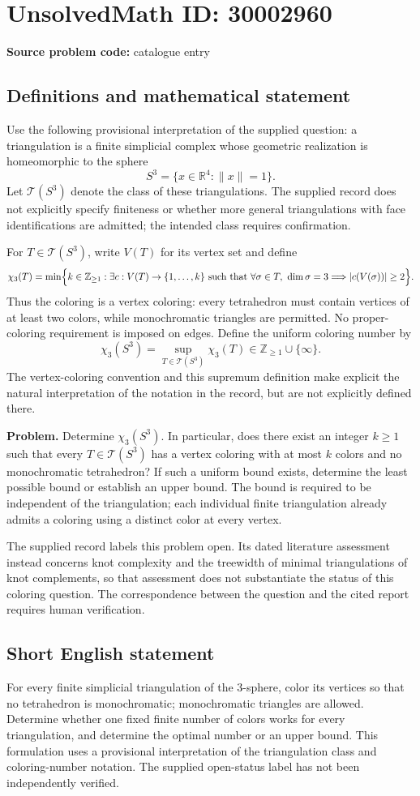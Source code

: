 \documentclass[11pt]{article}
\newcommand{\Z}{\mathbb{Z}}
\newcommand{\R}{\mathbb{R}}
\begin{document}
\section*{UnsolvedMath ID: 30002960}
\textbf{Source problem code:} catalogue entry
\subsection{Definitions and mathematical statement}
Use the following provisional interpretation of the supplied question: a triangulation is a finite simplicial complex whose geometric realization is homeomorphic to the sphere
\[
S^3=\{x\in\R^4:\|x\|=1\}.
\]
Let \(\mathcal T(S^3)\) denote the class of these triangulations. The supplied record does not explicitly specify finiteness or whether more general triangulations with face identifications are admitted; the intended class requires confirmation.

For \(T\in\mathcal T(S^3)\), write \(V(T)\) for its vertex set and define
\[
\chi_3(T)=\min\Bigl\{k\in\Z_{\geq 1}:\exists c:V(T)\to\{1,\ldots,k\}\ \text{such that}\ \forall\sigma\in T,\ \dim\sigma=3\Longrightarrow |c(V(\sigma))|\geq 2\Bigr\}.
\]
Thus the coloring is a vertex coloring: every tetrahedron must contain vertices of at least two colors, while monochromatic triangles are permitted. No proper-coloring requirement is imposed on edges. Define the uniform coloring number by
\[
\chi_3(S^3)=\sup_{T\in\mathcal T(S^3)}\chi_3(T)\in\Z_{\geq1}\cup\{\infty\}.
\]
The vertex-coloring convention and this supremum definition make explicit the natural interpretation of the notation in the record, but are not explicitly defined there.

\textbf{Problem.} Determine \(\chi_3(S^3)\). In particular, does there exist an integer \(k\geq1\) such that every \(T\in\mathcal T(S^3)\) has a vertex coloring with at most \(k\) colors and no monochromatic tetrahedron? If such a uniform bound exists, determine the least possible bound or establish an upper bound. The bound is required to be independent of the triangulation; each individual finite triangulation already admits a coloring using a distinct color at every vertex.

The supplied record labels this problem open. Its dated literature assessment instead concerns knot complexity and the treewidth of minimal triangulations of knot complements, so that assessment does not substantiate the status of this coloring question. The correspondence between the question and the cited report requires human verification.
\subsection{Short English statement}
For every finite simplicial triangulation of the \(3\)-sphere, color its vertices so that no tetrahedron is monochromatic; monochromatic triangles are allowed. Determine whether one fixed finite number of colors works for every triangulation, and determine the optimal number or an upper bound. This formulation uses a provisional interpretation of the triangulation class and coloring-number notation. The supplied open-status label has not been independently verified.
\end{document}
